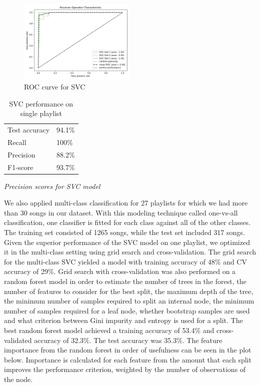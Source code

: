 \documentclass[acmtog]{acmart}
\begin{document}
\begin{figure}[h]
  \includegraphics[width=0.5\textwidth]{ROC_curve}
  \caption{ROC curve for SVC}
  \label{fig:ROC_curve}
\end{figure}

\newpage
\begin{table}%
\caption{SVC performance on single playlist}
\label{tab:one}
\begin{minipage}{\columnwidth}
\begin{center}
\begin{tabular}{ll}
  \toprule
  Test accuracy    & 94.1\%\\
  Recall  & 100\%\\
  Precision    & 88.2\%\\
  F1-score    & 93.7\%\\
  \bottomrule
\end{tabular}
\end{center}
\bigskip\centering
\footnotesize
 \emph{Precision scores for SVC model}
\end{minipage}
\end{table}%
\newpage
We also applied multi-class classification for 27 playlists for which we had more than 30 songs in our dataset. With this modeling technique called one-vs-all classification, one classifier is fitted for each class against all of the other classes. The training set consisted of 1265 songs, while the test set included 317 songs. Given the superior performance of the SVC model on one playlist, we optimized it in the multi-class setting using grid search and cross-validation. The grid search for the multi-class SVC yielded a model with training accuracy of 48\% and CV accuracy of 29\%. Grid search with cross-validation was also performed on a random forest model in order to estimate the number of trees in the forest, the number of features to consider for the best split, the maximum depth of the tree, the minimum number of samples required to split an internal node, the minimum number of samples required for a leaf node, whether bootstrap samples are used and what criterion between Gini impurity and entropy is used for a split. The best random forest model achieved a training accuracy of 53.4\% and cross-validated accuracy of 32.3\%. The test accuracy was 35.3\%. The feature importance from the random forest in order of usefulness can be seen in the plot below. Importance is calculated for each feature from the amount that each split improves the performance criterion, weighted by the number of observations of the node.
\end{document}
